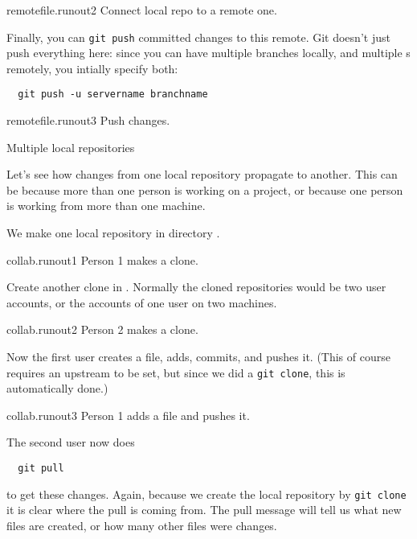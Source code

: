 \begin{gitstep}{remotefile.runout2}
  Connect local repo to a remote one.
\end{gitstep}

Finally, you can \lstinline{git push} committed changes to this remote.
Git doesn't just push everything here: since you can have multiple branches locally,
and multiple s remotely, you intially specify both:
\begin{lstlisting}
  git push -u servername branchname
\end{lstlisting}

\begin{gitstep}{remotefile.runout3}
  Push changes.
\end{gitstep}

 {Multiple local repositories}

Let's see how changes from one local repository
propagate to another.
This can be because more than one person is working on a project,
or because one person is working from more than one machine.

We make one local repository in directory .

\begin{gitstep}{collab.runout1}
  Person 1 makes a clone.
\end{gitstep}

Create another clone in .
Normally the cloned repositories would be two user accounts,
or the accounts of one user on two machines.

\begin{gitstep}{collab.runout2}
  Person 2 makes a clone.
\end{gitstep}

Now the first user creates a file, adds, commits, and pushes it.
(This of course requires an upstream to be set,
but since we did a \lstinline{git clone},
this is automatically done.)

\begin{gitstep}{collab.runout3}
  Person 1 adds a file and pushes it.
\end{gitstep}

The second user now does
\begin{lstlisting}
  git pull
\end{lstlisting}
to get these changes.
Again, because we create the local repository by \lstinline{git clone}
it is clear where the pull is coming from.
The pull message will tell us what new files are created,
or how many other files were changes.

